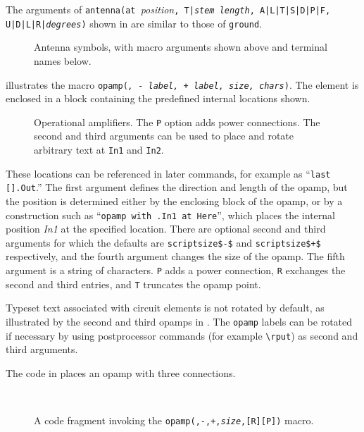The arguments of
{\tt antenna(at }{\sl position}{\tt,
  T|{\sl stem length}, A|L|T|S|D|P|F, U|D|L|R|{\sl degrees})}
shown in  are similar to those of {\tt ground}.
\begin{figure}[h!]
   
   \caption{Antenna symbols, with macro arguments shown above and
     terminal names below.}
   \label{Antennas}
   \end{figure}

 illustrates the macro
{\tt opamp({\sl\linespec, - label, + label, size, chars})\label{OPAMP}}.
The element is enclosed in a block
containing the predefined internal locations shown.
\begin{figure}[ht]
   
   \caption{Operational amplifiers.  The {\tt P} option adds
     power connections.  The second and third arguments can be used
     to place and rotate arbitrary text at {\tt In1} and {\tt In2}.}
   \label{Opamp}
   \end{figure}
These locations can be referenced in later
commands, for example as ``{\tt last [].Out}.''
The first argument defines the direction and length of the opamp, but the
position is determined either by the enclosing block of the opamp,
or by a construction such as ``{\tt opamp with .In1 at Here}'', which places
the internal position {\sl In1} at the specified location.
There are optional second and third arguments for which the defaults
are {\tt {}scriptsize\$-\$} and {\tt {}scriptsize\$+\$}
respectively, and the fourth argument changes the size of the opamp.
The fifth argument is a string of characters.  {\tt P}
adds a power connection, {\tt R} exchanges the second and
third entries, and {\tt T} truncates the opamp point.

Typeset text associated with circuit elements is not rotated by default,
as illustrated by the second and third opamps in .
The {\tt opamp} labels can be rotated if necessary by 
using postprocessor commands (for example \PSTricks \verb|\rput|)
as second and third arguments.

The code in  places an opamp with three connections.
\begin{figure}[h!b]
   \parbox{4in}{\small }%
   \quad\raise-0.2in\hbox{ }%
   \caption{A code fragment invoking the
    {\tt opamp(\linespec,-,+,{\sl size},[R][P])} macro.}
   \label{opampex}
   \end{figure}


